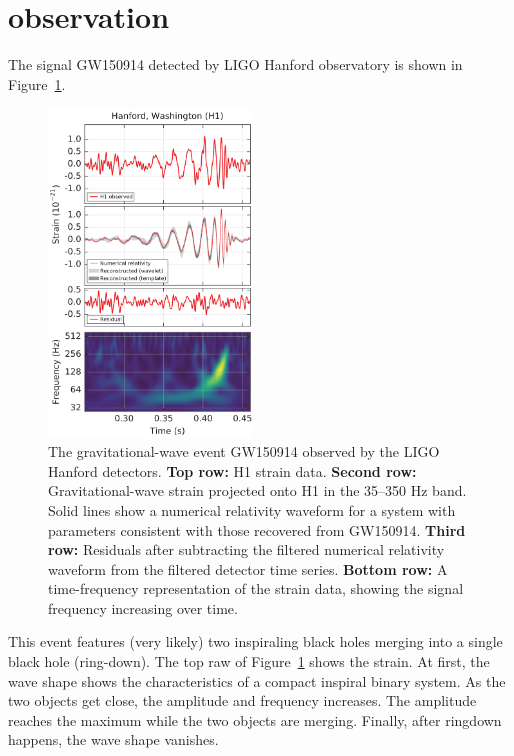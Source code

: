 \documentclass[twoside,twocolumn]{article}
\begin{document}

\section[Observation]{observation}\label{sec:observation}
The signal GW150914 detected by LIGO Hanford observatory is shown in Figure~\ref{fig:obs.h1}. 
\begin{figure}[hbpt]
  \begin{center}
    \includegraphics[width=0.48\textwidth]{figure/signalH1.png}
  \end{center}
  \caption{The gravitational-wave event GW150914 observed by the LIGO Hanford detectors. \textbf{Top row:} H1 strain data. \textbf{Second row:} Gravitational-wave strain projected onto H1 in the 35--350 Hz band. Solid lines show a numerical relativity waveform for a system with parameters consistent with those recovered from GW150914. \textbf{Third row:} Residuals after subtracting the filtered numerical relativity waveform from the filtered detector time series. \textbf{Bottom row:} A time-frequency representation of the strain data, showing the signal frequency increasing over time.}
  \label{fig:obs.h1}
\end{figure}
This event features (very likely) two inspiraling black holes merging into a single black hole (ring-down). The top raw of Figure~\ref{fig:obs.h1} shows the strain. At first, the wave shape shows the characteristics of a compact inspiral binary system. As the two objects get close, the amplitude and frequency increases. The amplitude reaches the maximum while the two objects are merging. Finally, after ringdown happens, the wave shape vanishes.
\end{document}
